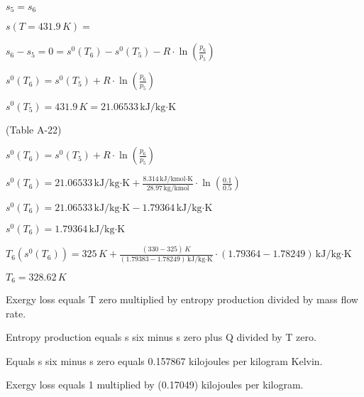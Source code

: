 \( s_5 = s_6 \)  

\( s(T = 431.9 \, K) = \)  

\( s_6 - s_5 = 0 = s^0(T_6) - s^0(T_5) - R \cdot \ln \left( \frac{p_6}{p_5} \right) \)  

\( s^0(T_6) = s^0(T_5) + R \cdot \ln \left( \frac{p_6}{p_5} \right) \)  

\( s^0(T_5) = 431.9 \, K = 21.06533 \, \text{kJ/kg·K} \)  

(Table A-22)  

\( s^0(T_6) = s^0(T_5) + R \cdot \ln \left( \frac{p_6}{p_5} \right) \)  

\( s^0(T_6) = 21.06533 \, \text{kJ/kg·K} + \frac{8.314 \, \text{kJ/kmol·K}}{28.97 \, \text{kg/kmol}} \cdot \ln \left( \frac{0.1}{0.5} \right) \)  

\( s^0(T_6) = 21.06533 \, \text{kJ/kg·K} - 1.79364 \, \text{kJ/kg·K} \)  

\( s^0(T_6) = 1.79364 \, \text{kJ/kg·K} \)  

\( T_6(s^0(T_6)) = 325 \, K + \frac{(330 - 325) \, K}{(1.79383 - 1.78249) \, \text{kJ/kg·K}} \cdot (1.79364 - 1.78249) \, \text{kJ/kg·K} \)  

\( T_6 = 328.62 \, K \)

Exergy loss equals T zero multiplied by entropy production divided by mass flow rate.  

Entropy production equals s six minus s zero plus Q divided by T zero.  

Equals s six minus s zero equals 0.157867 kilojoules per kilogram Kelvin.  

Exergy loss equals 1 multiplied by (0.17049) kilojoules per kilogram.